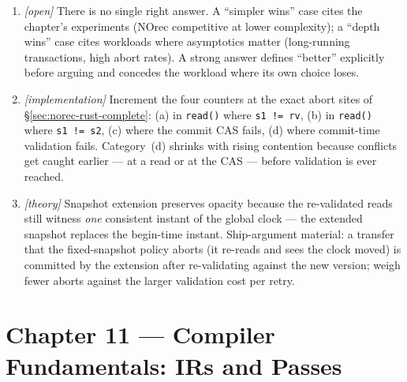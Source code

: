 \begin{enumerate}
          value-based commit-time validation, TL2's per-orec ownership and
          clock.  The book's read-validate pattern is the abstraction common
          to both; a real simplification to name is the book's single global
          clock and its omission of TL2's lock-table hashing or NOrec's
          Bloom-filter read-set encoding.
    \item \emph{[open]} There is no single right answer.  A ``simpler wins''
          case cites the chapter's experiments (NOrec competitive at lower
          complexity); a ``depth wins'' case cites workloads where
          asymptotics matter (long-running transactions, high abort rates).
          A strong answer defines ``better'' explicitly before arguing and
          concedes the workload where its own choice loses.
    \item \emph{[implementation]} Increment the four counters at the exact
          abort sites of \S\ref{sec:norec-rust-complete}: (a) in
          \texttt{read()} where \texttt{s1 != rv}, (b) in \texttt{read()}
          where \texttt{s1 != s2}, (c) where the commit CAS fails, (d) where
          commit-time validation fails.  Category~(d) shrinks with rising
          contention because conflicts get caught earlier --- at a read or
          at the CAS --- before validation is ever reached.
    \item \emph{[theory]} Snapshot extension preserves opacity because the
          re-validated reads still witness \emph{one} consistent instant of
          the global clock --- the extended snapshot replaces the begin-time
          instant.  Ship-argument material: a transfer that the
          fixed-snapshot policy aborts (it re-reads and sees the clock
          moved) is committed by the extension after re-validating against
          the new version; weigh fewer aborts against the larger validation
          cost per retry.
\end{enumerate}

\section*{Chapter 11 --- Compiler Fundamentals: IRs and Passes}

